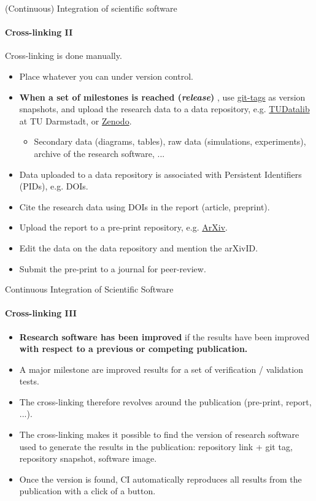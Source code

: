 \begin{frame}{(Continuous) Integration of scientific software} 
\framesubtitle{Cross-linking II}
\vfill

    Cross-linking is done manually. 
    \begin{itemize}
        \item Place whatever you can under version control. 
        \item \textbf{When a set of milestones is reached (\emph{release})} , use \href{https://git-scm.com/book/en/v2/Git-Basics-Tagging}{git-tags} as version snapshots, and upload the research data to a data repository, e.g. \href{https://tudatalib.ulb.tu-darmstadt.de/}{TUDatalib} at TU Darmstadt, or \href{https://zenodo.org/}{Zenodo}.
            \begin{itemize}
                \item Secondary data (diagrams, tables), raw data (simulations, experiments), archive of the research software, ...
            \end{itemize}
        \item Data uploaded to a data repository is associated with Persistent Identifiers (PIDs), e.g. DOIs.
        \item Cite the research data using DOIs in the report (article, preprint).
        \item Upload the report to a pre-print repository, e.g. \href{https://arxiv.org/}{ArXiv}. 
        \item Edit the data on the data repository and mention the arXivID.  
        \item Submit the pre-print to a journal for peer-review.
    \end{itemize}

\end{frame}


\begin{frame}[fragile]{Continuous Integration of Scientific Software}
    \framesubtitle{Cross-linking III} 
    \vfill

    \begin{itemize}
        \item \textbf{Research software has been improved} if the results have been improved \textbf{with respect to a previous or competing publication.}
        \item A major milestone are improved results for a set of verification / validation tests.
        \item The cross-linking therefore revolves around the publication (pre-print, report, ...). 
        \item The cross-linking makes it possible to find the version of research software used to generate the results in the publication: repository link + git tag, repository snapshot, software image. 
        \item Once the version is found, CI automatically reproduces all results from the publication with a click of a button.
    \end{itemize}

\end{frame}

